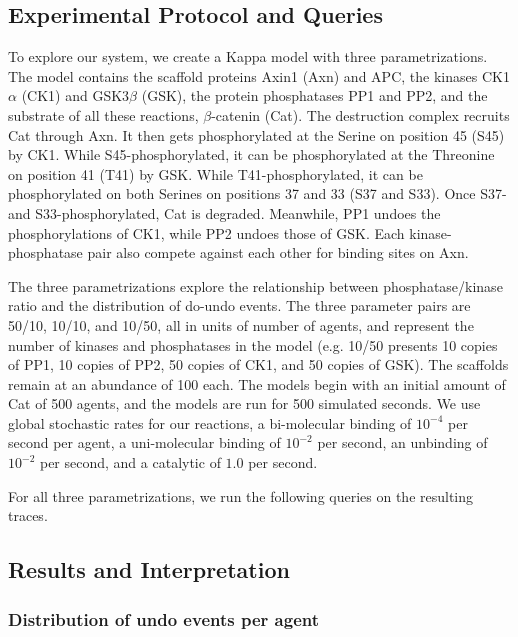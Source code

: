 \subsection{Experimental Protocol and Queries}

To explore our system, we create a Kappa model with three
parametrizations. The model contains the scaffold proteins Axin1 (Axn)
and APC, the kinases CK1$\alpha$ (CK1) and GSK3$\beta$ (GSK), the
protein phosphatases PP1 and PP2, and the substrate of all these
reactions, $\beta$-catenin (Cat). The destruction complex recruits
Cat through Axn. It then gets phosphorylated at the Serine on position
45 (S45) by CK1. While S45-phosphorylated, it can be phosphorylated at
the Threonine on position 41 (T41) by GSK. While T41-phosphorylated,
it can be phosphorylated on both Serines on positions 37 and 33 (S37 and
S33). Once S37- and S33-phosphorylated, Cat is degraded. Meanwhile, PP1
undoes the phosphorylations of CK1, while PP2 undoes those of GSK. Each
kinase-phosphatase pair also compete against each other for binding sites
on Axn.

The three parametrizations explore the relationship
between phosphatase/kinase ratio and the distribution of do-undo
events. The three parameter pairs are 50/10, 10/10, and
10/50, all in units of number of agents, and represent the number of kinases and
phosphatases in the model (e.g. 10/50 presents 10 copies of PP1, 10
copies of PP2, 50 copies of CK1, and 50 copies of GSK). The scaffolds
remain at an abundance of 100 each. The models begin with an initial
amount of Cat of 500 agents, and the models are run for 500
simulated seconds. We use global stochastic rates for our reactions, a bi-molecular binding of $10^{-4}$ per second per agent, a uni-molecular binding of $10^{-2}$ per second, an unbinding of $10^{-2}$ per second, and a catalytic of $1.0$ per second.

For all three parametrizations, we run the following queries on the
resulting traces.




\subsection{Results and Interpretation}

\subsubsection*{Distribution of undo events per agent}

